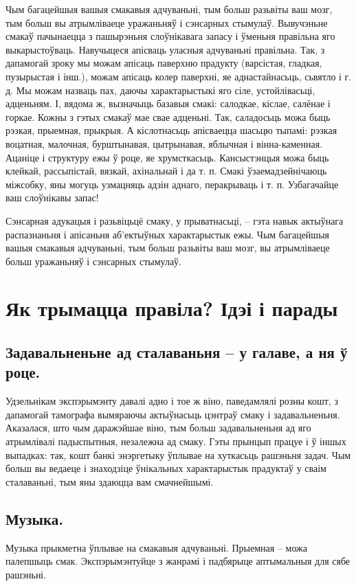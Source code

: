 Чым багацейшыя вашыя смакавыя адчуваньні, тым больш разьвіты ваш мозг, тым больш вы атрымліваеце уражаньняў і сэнсарных стымулаў. Вывучэньне смакаў пачынаецца з пашырэньня слоўнікавага запасу і ўменьня правільна яго выкарыстоўваць. Навучыцеся апісваць уласныя адчуваньні правільна. Так, з дапамогай зроку мы можам апісаць паверхню прадукту (варсістая, гладкая, пузырыстая і інш.), можам апісаць колер паверхні, яе аднастайнасьць, сьвятло і г. д. Мы можам назваць пах, даючы характарыстыкі яго сіле, устойлівасьці, адценьням. І, вядома ж, вызначыць базавыя смакі: салодкае, кіслае, салёнае і горкае. Кожны з гэтых смакаў мае свае адценьні. Так, саладосьць можа быць рэзкая, прыемная, прыкрыя. А кіслотнасьць апісваецца шасьцю тыпамі: рэзкая воцатная, малочная, бурштынавая, цытрынавая, яблычная і вінна-каменная. Ацаніце і структуру ежы ў роце, яе хрумсткасьць. Кансыстэнцыя можа быць клейкай, рассыпістай, вязкай, ахінальнай і да т. п. Смакі ўзаемадзейнічаюць міжсобку, яны могуць узмацняць адзін аднаго, перакрываць і т. п. Узбагачайце ваш слоўнікавы запас!

Сэнсарная адукацыя і разьвіцьцё смаку, у прыватнасьці, – гэта навык актыўнага распазнаньня і апісаньня аб'ектыўных характарыстык ежы. Чым багацейшыя вашыя смакавыя адчуваньні, тым больш разьвіты ваш мозг, вы атрымліваеце больш уражаньняў і сэнсарных стымулаў.

\section{Як трымацца правіла? Ідэі і парады}

\subsection{Задавальненьне ад сталаваньня – у галаве, а ня ў роце.}
Удзельнікам экспэрымэнту давалі адно і тое ж віно, паведамлялі розны кошт, з дапамогай тамографа вымяраючы актыўнасьць цэнтраў смаку і задавальненьня. Аказалася, што чым даражэйшае віно, тым больш задавальненьня ад яго атрымлівалі падыспытныя, незалежна ад смаку. Гэты прынцып працуе і ў іншых выпадках: так, кошт банкі энэргетыку ўплывае на хуткасьць рашэньня задач. Чым больш вы ведаеце і знаходзіце ўнікальных характарыстык прадуктаў у сваім сталаваньні, тым яны здаюцца вам смачнейшымі.

\subsection{Музыка.}
Музыка прыкметна ўплывае на смакавыя адчуваньні. Прыемная – можа палепшыць смак. Экспэрымэнтуйце з жанрамі і падбярыце аптымальныя для сябе рашэньні.

